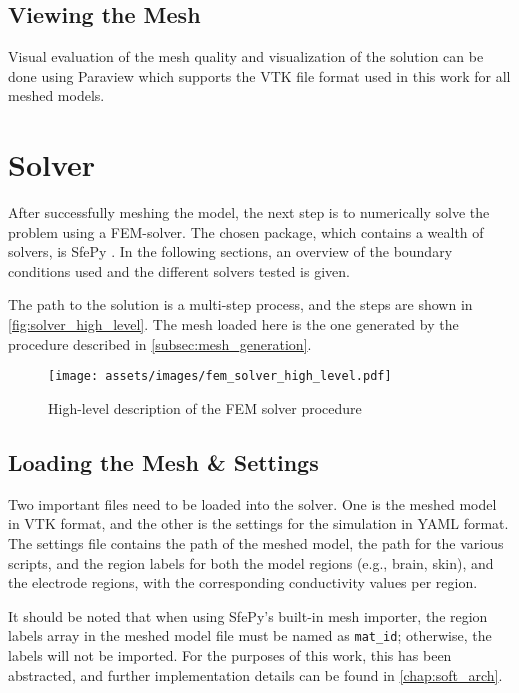 \subsection{Viewing the Mesh}

Visual evaluation of the mesh quality and visualization of the solution can be done using Paraview \cite{paraview} which supports the \gls{VTK} file format used in this work for all meshed models.

\section{Solver}
\label{sec:fem_solver}

After successfully meshing the model, the next step is to numerically solve the problem using a \gls{FEM}-solver. The chosen package, which contains a wealth of solvers, is SfePy \cite{Cimrman2019}. In the following sections, an overview of the boundary conditions used and the different solvers tested is given.

The path to the solution is a multi-step process, and the steps are shown in \autoref{fig:solver_high_level}. The mesh loaded here is the one generated by the procedure described in \ref{subsec:mesh_generation}.

\begin{figure}[H]
    \centering
    \texttt{[image: assets/images/fem\_solver\_high\_level.pdf]}
    \caption{High-level description of the \gls{FEM} solver procedure}
    \label{fig:solver_high_level}
\end{figure}

\subsection{Loading the Mesh \& Settings}

Two important files need to be loaded into the solver. One is the meshed model in \gls{VTK} format, and the other is the settings for the simulation in \gls{YAML} format. The settings file contains the path of the meshed model, the path for the various scripts, and the region labels for both the model regions (e.g., brain, skin), and the electrode regions, with the corresponding conductivity values per region.

It should be noted that when using SfePy's built-in mesh importer, the region labels array in the meshed model file must be named as \texttt{mat\_id}; otherwise, the labels will not be imported. For the purposes of this work, this has been abstracted, and further implementation details can be found in \autoref{chap:soft_arch}.


